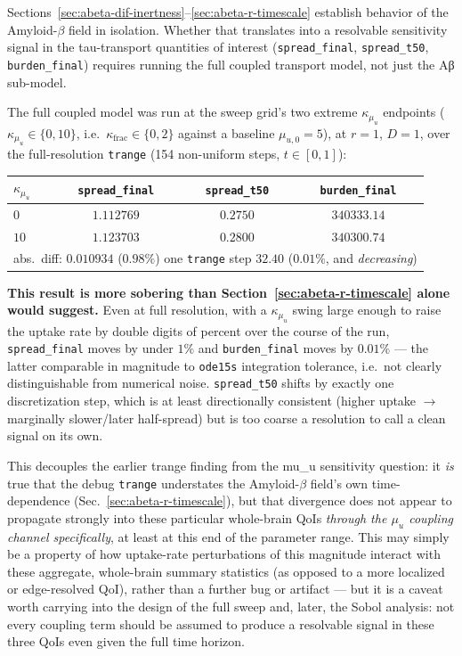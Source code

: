 Sections~\ref{sec:abeta-dif-inertness}--\ref{sec:abeta-r-timescale} establish behavior of the Amyloid-$\beta$ field in isolation. Whether that translates into a resolvable sensitivity signal in the tau-transport quantities of interest (\texttt{spread\_final}, \texttt{spread\_t50}, \texttt{burden\_final}) requires running the full coupled transport model, not just the Aβ sub-model.

The full coupled model was run at the sweep grid's two extreme $\kappa_{\mu_u}$ endpoints ($\kappa_{\mu_u} \in \{0, 10\}$, i.e.\ $\kappa_{\mathrm{frac}} \in \{0, 2\}$ against a baseline $\mu_{u,0} = 5$), at $r=1$, $D=1$, over the full-resolution \texttt{trange} (154 non-uniform steps, $t \in [0,1]$):

\begin{center}
\begin{tabular}{lccc}
\hline
$\kappa_{\mu_u}$ & \texttt{spread\_final} & \texttt{spread\_t50} & \texttt{burden\_final} \\
\hline
$0$  & $1.112769$ & $0.2750$ & $340333.14$ \\
$10$ & $1.123703$ & $0.2800$ & $340300.74$ \\
\hline
\multicolumn{4}{l}{\footnotesize abs.\ diff: $0.010934$ ($0.98\%$) \hspace{1em} one \texttt{trange} step \hspace{1em} $32.40$ ($0.01\%$, and \emph{decreasing})} \\
\hline
\end{tabular}
\end{center}

\textbf{This result is more sobering than Section~\ref{sec:abeta-r-timescale} alone would suggest.} Even at full resolution, with a $\kappa_{\mu_u}$ swing large enough to raise the uptake rate by double digits of percent over the course of the run, \texttt{spread\_final} moves by under $1\%$ and \texttt{burden\_final} moves by $0.01\%$ --- the latter comparable in magnitude to \texttt{ode15s} integration tolerance, i.e.\ not clearly distinguishable from numerical noise. \texttt{spread\_t50} shifts by exactly one discretization step, which is at least directionally consistent (higher uptake $\to$ marginally slower/later half-spread) but is too coarse a resolution to call a clean signal on its own.

This decouples the earlier trange finding from the mu\_u sensitivity question: it \emph{is} true that the debug \texttt{trange} understates the Amyloid-$\beta$ field's own time-dependence (Sec.~\ref{sec:abeta-r-timescale}), but that divergence does not appear to propagate strongly into these particular whole-brain QoIs \emph{through the $\mu_u$ coupling channel specifically}, at least at this end of the parameter range. This may simply be a property of how uptake-rate perturbations of this magnitude interact with these aggregate, whole-brain summary statistics (as opposed to a more localized or edge-resolved QoI), rather than a further bug or artifact --- but it is a caveat worth carrying into the design of the full sweep and, later, the Sobol analysis: not every coupling term should be assumed to produce a resolvable signal in these three QoIs even given the full time horizon.
